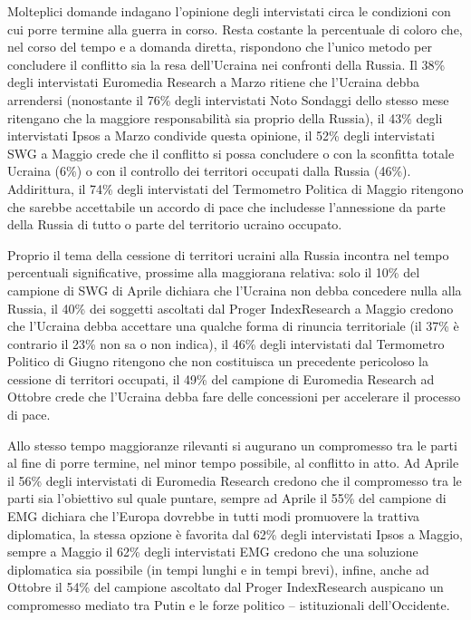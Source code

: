 \documentclass[
]{book}
\begin{document}
Molteplici domande indagano l'opinione degli intervistati circa le condizioni con cui porre termine alla guerra in corso. Resta costante la percentuale di coloro che, nel corso del tempo e a domanda diretta, rispondono che l'unico metodo per concludere il conflitto sia la resa dell'Ucraina nei confronti della Russia. Il 38\% degli intervistati Euromedia Research a Marzo ritiene che l'Ucraina debba arrendersi (nonostante il 76\% degli intervistati Noto Sondaggi dello stesso mese ritengano che la maggiore responsabilità sia proprio della Russia), il 43\% degli intervistati Ipsos a Marzo condivide questa opinione, il 52\% degli intervistati SWG a Maggio crede che il conflitto si possa concludere o con la sconfitta totale Ucraina (6\%) o con il controllo dei territori occupati dalla Russia (46\%). Addirittura, il 74\% degli intervistati del Termometro Politica di Maggio ritengono che sarebbe accettabile un accordo di pace che includesse l'annessione da parte della Russia di tutto o parte del territorio ucraino occupato.

Proprio il tema della cessione di territori ucraini alla Russia incontra nel tempo percentuali significative, prossime alla maggiorana relativa: solo il 10\% del campione di SWG di Aprile dichiara che l'Ucraina non debba concedere nulla alla Russia, il 40\% dei soggetti ascoltati dal Proger IndexResearch a Maggio credono che l'Ucraina debba accettare una qualche forma di rinuncia territoriale (il 37\% è contrario il 23\% non sa o non indica), il 46\% degli intervistati dal Termometro Politico di Giugno ritengono che non costituisca un precedente pericoloso la cessione di territori occupati, il 49\% del campione di Euromedia Research ad Ottobre crede che l'Ucraina debba fare delle concessioni per accelerare il processo di pace.

Allo stesso tempo maggioranze rilevanti si augurano un compromesso tra le parti al fine di porre termine, nel minor tempo possibile, al conflitto in atto. Ad Aprile il 56\% degli intervistati di Euromedia Research credono che il compromesso tra le parti sia l'obiettivo sul quale puntare, sempre ad Aprile il 55\% del campione di EMG dichiara che l'Europa dovrebbe in tutti modi promuovere la trattiva diplomatica, la stessa opzione è favorita dal 62\% degli intervistati Ipsos a Maggio, sempre a Maggio il 62\% degli intervistati EMG credono che una soluzione diplomatica sia possibile (in tempi lunghi e in tempi brevi), infine, anche ad Ottobre il 54\% del campione ascoltato dal Proger IndexResearch auspicano un compromesso mediato tra Putin e le forze politico -- istituzionali dell'Occidente.
\end{document}
